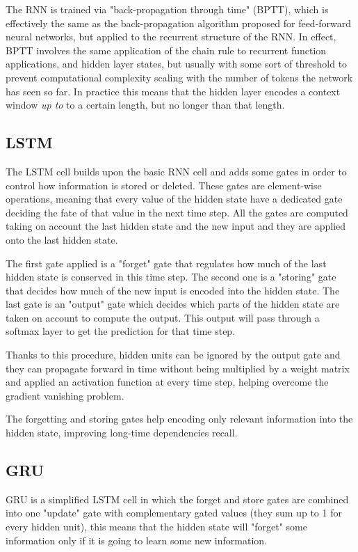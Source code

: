 \documentclass[a4paper]{article}
\begin{document}
The RNN is trained via "back-propagation through time" (BPTT), which is
effectively the same as the back-propagation algorithm proposed for feed-forward
neural networks, but applied to the recurrent structure of the RNN. In effect,
BPTT involves the same application of the chain rule to recurrent function
applications, and hidden layer states, but usually with some sort of threshold
to prevent computational complexity scaling with the number of tokens the
network has seen so far. In practice this means that the hidden layer encodes
a context window \emph{up to} to a certain length, but no longer than
that length.

\subsection{LSTM}
\label{sec:lstm}
The LSTM cell builds upon the basic RNN cell and adds some gates in order to control how information is stored or deleted. These gates are element-wise operations, meaning that every value of the hidden state have a dedicated gate deciding the fate of that value in the next time step. All the gates are computed taking on account the last hidden state and the new input and they are applied onto the last hidden state.

The first gate applied is a "forget" gate that regulates how much of the last hidden state is conserved in this time step. 
The second one is a "storing" gate that decides how much of the new input is encoded into the hidden state.
The last gate is an "output" gate which decides which parts of the hidden state are taken on account to compute the output. This output will pass through a softmax layer to get the prediction for that time step.

Thanks to this procedure, hidden units can be ignored by the output gate and they can propagate forward in time without being multiplied by a weight matrix and applied an activation function at every time step, helping overcome the gradient vanishing problem.

The forgetting and storing gates help encoding only relevant information into the hidden state, improving long-time dependencies recall.
\subsection{GRU}
\label{sec:gru}
GRU is a simplified LSTM cell in which the forget and store gates are combined into one "update" gate with complementary gated values (they sum up to 1 for every hidden unit), this means that the hidden state will "forget" some information only if it is going to learn some new information.
\end{document}
